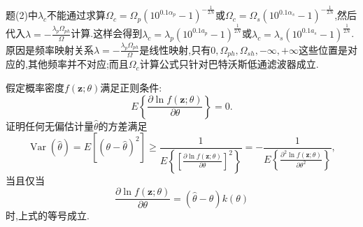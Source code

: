 \documentclass[list,answers,csize4,custom]{sysuexam}
\begin{document}
\begin{groups}
\begin{questions}[rst]
\begin{solution}
        \remark 题(2)中$\lambda_c$不能通过求算$\Omega_c=\Omega_p(10^{0.1\alpha_p}-1)^{-\frac{1}{2N}}$或$\Omega_c=\Omega_s(10^{0.1\alpha_s}-1)^{-\frac{1}{2N}}$,然后代入$\lambda=-\frac{\lambda_{p}\Omega_{ph}}{\Omega}$计算.这样会得到$\lambda_{c}=\lambda_{p}\left(10^{0.1 a_{p}}-1\right)^{\frac{1}{2 N}}$或$\lambda_{c}=\lambda_{s}\left(10^{0.1 a_{s}}-1\right)^{\frac{1}{2 N}}$.原因是频率映射关系$\lambda=-\frac{\lambda_{p}\Omega_{ph}}{\Omega}$是线性映射,只有$0,\Omega_{ph},\Omega_{sh},-\infty,+\infty$这些位置是对应的,其他频率并不对应;而且$\Omega_c$计算公式只针对巴特沃斯低通滤波器成立.
    \end{solution}

    \question[10] 假定概率密度$f(\boldsymbol{z} ; \theta)$满足正则条件:
    $$E\left\{\frac{\partial \ln f(\boldsymbol{z} ; \theta)}{\partial \theta}\right\}=0.$$
    证明任何无偏估计量$\hat{\theta}$的方差满足
    $$\operatorname{Var}(\hat{\theta})=E\left[(\theta-\hat{\theta})^{2}\right] \geqslant \frac{1}{E\left\{\left[\frac{\partial \ln f(\boldsymbol{z} ; \theta)}{\partial \theta}\right]^{2}\right\}}=-\frac{1}{E\left\{\frac{\partial^{2} \ln f(\boldsymbol{z} ; \theta)}{\partial \theta^{2}}\right\}},$$
    当且仅当$$\frac{\partial \ln f(\boldsymbol{z} ; \theta)}{\partial \theta}=(\hat{\theta}-\theta) k(\theta)$$时,上式的等号成立.\par
    

\end{questions}
\end{groups}
\end{document}
